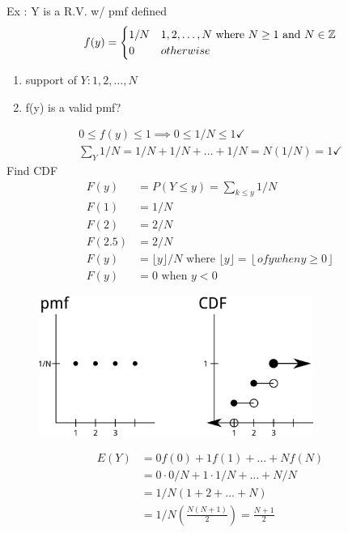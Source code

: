     Ex : Y is a R.V. w/ pmf defined 
    \begin{align*}
	f(y) = 
	\begin{cases}
	    1/N & 1, 2, \ldots, N \text{ where } N \ge 1 \text{ and } N \in \mathbb{Z} \\
	    0 & otherwise
	\end{cases}
    \end{align*}
    \begin{enumerate}
        \item support of $Y : 1, 2, \ldots, N$ 
	\item f(y) is a valid pmf?
    \end{enumerate}
    \begin{align*}
	0 \le f(y) \le 1 \implies 0 \le 1/N \le 1 \checkmark \\
	\sum\limits_{Y} 1/N = 1/N + 1/N + \ldots + 1/N = N(1/N) = 1 \checkmark
    \end{align*}
    Find CDF
    \begin{align*}
	F(y) &= P(Y \le y ) = \sum\limits_{k \le y} 1/N \\
	F(1) &= 1/N \\
	F(2) &= 2/N \\
	F(2.5) &= 2/N \\
	F(y) &= \lfloor y \rfloor / N \text{ where } \lfloor y \rfloor = \left\lfloor  of y when y \ge 0 \right\rfloor \\
	F(y) &= 0 \text{ when } y < 0
    \end{align*}
    \begin{figure}[H]
        \centering
        \includegraphics[width=0.8\textwidth]{./figs/floor}
        \label{fig:s-floor}
    \end{figure}
    \begin{align*}
	E(Y) &= 0f(0) + 1f(1) + \ldots + Nf(N) \\
	&= 0 \cdot 0/N + 1 \cdot 1/N + \ldots + N/N \\
	&= 1/N(1 + 2 + \ldots + N) \\
	&= 1/N(\frac{N(N + 1)}{2}) = \frac{N + 1}{2}
    \end{align*}

